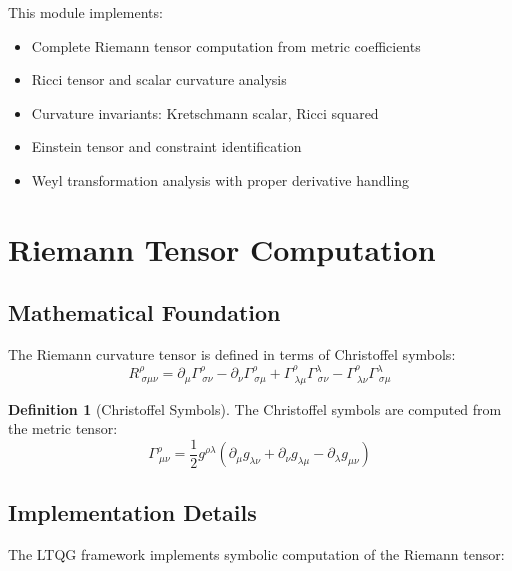 \documentclass[11pt,a4paper]{article}
\theoremstyle{definition}
\newtheorem{definition}[theorem]{Definition}
\theoremstyle{remark}
\newcommand{\Christoffel}{\Gamma}
\begin{document}
This module implements:
\begin{itemize}
\item Complete Riemann tensor computation from metric coefficients
\item Ricci tensor and scalar curvature analysis
\item Curvature invariants: Kretschmann scalar, Ricci squared
\item Einstein tensor and constraint identification
\item Weyl transformation analysis with proper derivative handling
\end{itemize}

\section{Riemann Tensor Computation}

\subsection{Mathematical Foundation}

The Riemann curvature tensor is defined in terms of Christoffel symbols:
\begin{equation}
R^\rho_{\ \sigma\mu\nu} = \partial_\mu \Christoffel^\rho_{\ \sigma\nu} - \partial_\nu \Christoffel^\rho_{\ \sigma\mu} + \Christoffel^\rho_{\ \lambda\mu} \Christoffel^\lambda_{\ \sigma\nu} - \Christoffel^\rho_{\ \lambda\nu} \Christoffel^\lambda_{\ \sigma\mu}
\end{equation}

\begin{definition}[Christoffel Symbols]
The Christoffel symbols are computed from the metric tensor:
\begin{equation}
\Christoffel^\rho_{\ \mu\nu} = \frac{1}{2} g^{\rho\lambda} \left( \partial_\mu g_{\lambda\nu} + \partial_\nu g_{\lambda\mu} - \partial_\lambda g_{\mu\nu} \right)
\end{equation}
\end{definition}

\subsection{Implementation Details}

The LTQG framework implements symbolic computation of the Riemann tensor:
\end{document}

